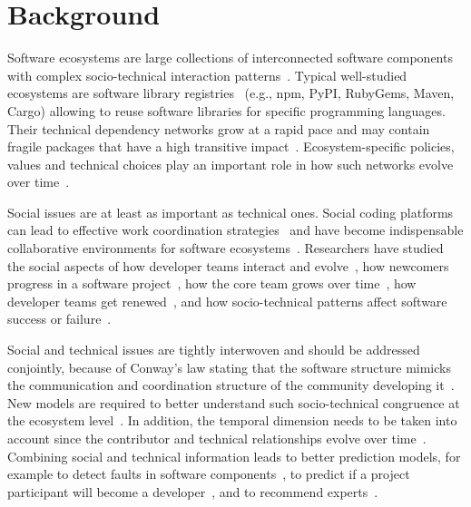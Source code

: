 

\section{Background}

Software ecosystems are large collections of interconnected software components with complex socio-technical interaction patterns~\cite{Lungu2009,ManikasHansen2013}. %
Typical well-studied ecosystems are software library registries~\cite{Decan2017SANER,Kikas2017,Dietrich2019} (e.g., npm, PyPI, RubyGems, Maven, Cargo) allowing to reuse software libraries for specific programming languages.
 Their technical dependency networks grow at a rapid pace and may contain fragile packages that have a high transitive impact~\cite{Decan2019EMSE}. Ecosystem-specific policies, values and technical choices play an important role in how such networks evolve over time~\cite{Bogart2016}.

Social issues are at least as important as technical ones. Social coding platforms can lead to effective work coordination strategies~\cite{DabbishSTH12} and have become indispensable collaborative environments for software ecosystems~\cite{Herbsleb1999}.
Researchers have studied the social aspects of how developer teams interact and evolve~\cite{lopezfernandez2006:sna}, how newcomers progress in a software project~\cite{Zhou2011-ICSE,Zhou2012-ICSE}, how the core team grows over time~\cite{Robles2009MSR}, how developer teams get renewed~\cite{Constantinou2017SANER}, and how socio-technical patterns affect software success or failure~\cite{SurianTLCL13}. 

Social and technical issues are tightly interwoven and should be addressed conjointly, because of Conway's law stating that the software structure mimicks the communication and coordination structure of the community developing it~\cite{Conway1968, Herbsleb1999, Kwan2011,Blincoe2019}. New models are required to better understand such socio-technical congruence at the ecosystem level~\cite{Palyart2018TSE}. In addition, the temporal dimension needs to be taken into account since the contributor and technical relationships evolve over time~\cite{Cataldo2008}.
Combining social and technical information leads to better prediction models, for example to detect faults in software components~\cite{Bird2009,Bhattacharya2012}, to predict %
if a project participant will become a developer~\cite{Gharehyazie2013-ICSM}, and to recommend %
experts~\cite{Kintab:2014:RSE:2735522.2735526}.

